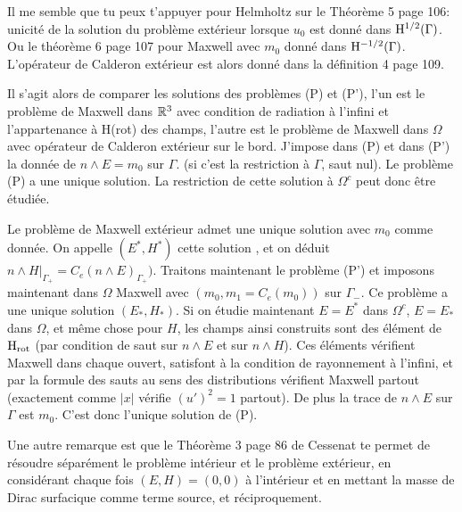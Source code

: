     \begin{REM}
        
        Il me semble que tu peux t'appuyer pour Helmholtz sur le Théorème 5 page 106: unicité de la solution du problème extérieur lorsque \(u_0\) est donné dans \(\Sobolev[1/2](\Gamma)\).
        Ou le théorème 6 page 107 pour Maxwell avec \(m_0\) donné dans \(\Sobolev[-1/2](\Gamma)\).
        L'opérateur de Calderon extérieur est alors donné dans la définition 4 page 109.
        
        Il s'agit alors de comparer les solutions des problèmes (P) et (P'), l'un est le problème de Maxwell dans \(\RR^3\) avec condition de radiation à l'infini et l'appartenance à H(rot) des champs, l'autre est le problème de Maxwell dans \(\Omega\) avec opérateur de Calderon extérieur sur le bord.
        J'impose dans (P) et dans (P') la donnée de \(n\wedge E=m_0\) sur \(\Gamma\). (si c'est la restriction à \(\Gamma\), saut nul).
        Le problème (P)  a une unique solution.
        La restriction de cette solution à \(\Omega^c\) peut donc être étudiée.
        
        
        Le problème de Maxwell extérieur admet une unique solution avec \(m_0\) comme donnée. On appelle \((E^*, H^*)\) cette solution , et on déduit \(n\wedge H\vert_{\Gamma_+}= C_e(n\wedge E)_{\Gamma_+})\).
        Traitons maintenant le problème (P') et imposons maintenant dans \(\Omega\) Maxwell avec \((m_0, m_1=C_e(m_0))\) sur \(\Gamma_-\).
        Ce problème a une unique solution \((E_*, H_*)\).
        Si on étudie maintenant \(E=E^*\) dans \(\Omega^c\), \(E=E_*\) dans \(\Omega\), et même chose pour \(H\), les champs ainsi construits sont des élément de \(\Hrot\) (par condition de saut sur \(n\wedge E\) et sur \(n\wedge H\)).
        Ces éléments vérifient Maxwell dans chaque ouvert, satisfont à la condition de rayonnement à l'infini, et par la formule des sauts au sens des distributions vérifient Maxwell partout (exactement comme \(\vert x\vert\) vérifie \((u')^2=1\) partout).
        De plus la trace de \(n\wedge E\) sur \(\Gamma\) est \(m_0\). C'est donc l'unique solution de (P).
        
        
    \end{REM}
    \begin{REM}
    Une autre remarque est que le Théorème 3 page 86 de Cessenat te permet de résoudre séparément le problème intérieur et le problème extérieur, en considérant chaque fois \((E,H)=(0,0)\) à l'intérieur et en mettant la masse de Dirac surfacique comme terme source, et réciproquement.
    \end{REM}

